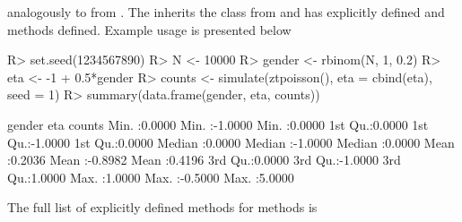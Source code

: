 \documentclass[
]{jss}
\newcommand{\1}{\mathcal{I}} \newcommand{\bZero}{\boldsymbol{0}}
\begin{document}
analogously to  from . The 
inherits the  class from  and has explicitly
defined  and  methods defined. Example usage
is presented below

\begin{CodeChunk}
\begin{CodeInput}
R> set.seed(1234567890)
R> N <- 10000
R> gender <- rbinom(N, 1, 0.2)
R> eta <- -1 + 0.5*gender
R> counts <- simulate(ztpoisson(), eta = cbind(eta), seed = 1)
R> summary(data.frame(gender, eta, counts))
\end{CodeInput}
\begin{CodeOutput}
     gender            eta              counts      
 Min.   :0.0000   Min.   :-1.0000   Min.   :0.0000  
 1st Qu.:0.0000   1st Qu.:-1.0000   1st Qu.:0.0000  
 Median :0.0000   Median :-1.0000   Median :0.0000  
 Mean   :0.2036   Mean   :-0.8982   Mean   :0.4196  
 3rd Qu.:0.0000   3rd Qu.:-1.0000   3rd Qu.:1.0000  
 Max.   :1.0000   Max.   :-0.5000   Max.   :5.0000  
\end{CodeOutput}
\end{CodeChunk}

The full list of explicitly defined methods for
 methods is
\end{document}
